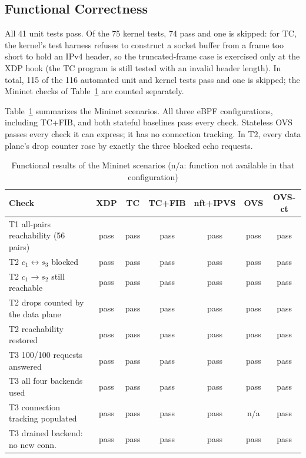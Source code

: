 \documentclass[conference]{IEEEtran}
\begin{document}
\subsection{Functional Correctness}
All 41 unit tests pass. Of the 75 kernel tests, 74 pass and one is skipped:
for TC, the kernel's test harness refuses to construct a socket buffer from a
frame too short to hold an IPv4 header, so the truncated-frame case is
exercised only at the XDP hook (the TC program is still tested with an
invalid header length). In total, 115 of the 116 automated unit and kernel
tests pass and one is skipped; the Mininet checks of Table~\ref{tab:correct}
are counted separately.

Table~\ref{tab:correct} summarizes the Mininet scenarios. All three eBPF
configurations, including TC+FIB, and both stateful baselines pass every
check. Stateless OVS passes every check it can express; it has no connection
tracking. In T2, every data plane's drop counter rose by exactly the three
blocked echo requests.

\begin{table}[t]
\caption{Functional results of the Mininet scenarios (n/a: function not
available in that configuration)}
\label{tab:correct}
\centering\scriptsize
\setlength{\tabcolsep}{2.0pt}
\begin{tabular}{@{}lcccccc@{}}
\toprule
Check & XDP & TC & TC+FIB & nft+IPVS & OVS & OVS-ct \\
\midrule
T1 all-pairs reachability (56 pairs) & pass & pass & pass & pass & pass & pass \\
T2 $c_1 \leftrightarrow s_3$ blocked & pass & pass & pass & pass & pass & pass \\
T2 $c_1 \to s_2$ still reachable & pass & pass & pass & pass & pass & pass \\
T2 drops counted by the data plane & pass & pass & pass & pass & pass & pass \\
T2 reachability restored & pass & pass & pass & pass & pass & pass \\
T3 100/100 requests answered & pass & pass & pass & pass & pass & pass \\
T3 all four backends used & pass & pass & pass & pass & pass & pass \\
T3 connection tracking populated & pass & pass & pass & pass & n/a & pass \\
T3 drained backend: no new conn. & pass & pass & pass & pass & pass & pass \\
\bottomrule
\end{tabular}
\end{table}
\end{document}

